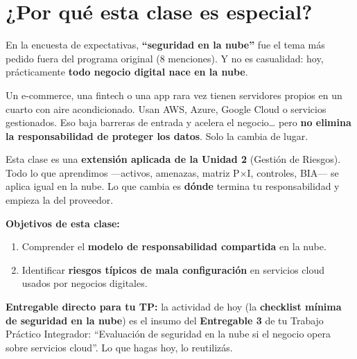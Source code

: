 \documentclass[12pt,a4paper]{article}
\begin{document}
\tableofcontents
\newpage

\section{¿Por qu\'e esta clase es especial?}

En la encuesta de expectativas, \textbf{``seguridad en la nube''} fue el tema m\'as pedido fuera del programa original (8 menciones). Y no es casualidad: hoy, pr\'acticamente \textbf{todo negocio digital nace en la nube}.

\begin{cajaConcepto}[title={La realidad}]
Un e-commerce, una fintech o una app rara vez tienen servidores propios en un cuarto con aire acondicionado. Usan AWS, Azure, Google Cloud o servicios gestionados. Eso baja barreras de entrada y acelera el negocio\ldots{} pero \textbf{no elimina la responsabilidad de proteger los datos}. Solo la cambia de lugar.
\end{cajaConcepto}

\begin{cajaNube}
Esta clase es una \textbf{extensi\'on aplicada de la Unidad 2} (Gesti\'on de Riesgos). Todo lo que aprendimos ---activos, amenazas, matriz P$\times$I, controles, BIA--- se aplica igual en la nube. Lo que cambia es \textbf{d\'onde} termina tu responsabilidad y empieza la del proveedor.
\end{cajaNube}

\vspace{6pt}
\noindent\textbf{Objetivos de esta clase:}
\begin{enumerate}[leftmargin=2em]
  \item Comprender el \textbf{modelo de responsabilidad compartida} en la nube.
  \item Identificar \textbf{riesgos t\'ipicos de mala configuraci\'on} en servicios cloud usados por negocios digitales.
\end{enumerate}

\begin{cajaNota}
\textbf{Entregable directo para tu TP:} la actividad de hoy (la \textbf{checklist m\'inima de seguridad en la nube}) es el insumo del \textbf{Entregable 3} de tu Trabajo Pr\'actico Integrador: ``Evaluaci\'on de seguridad en la nube si el negocio opera sobre servicios cloud''. Lo que hagas hoy, lo reutiliz\'as.
\end{cajaNota}
\end{document}
